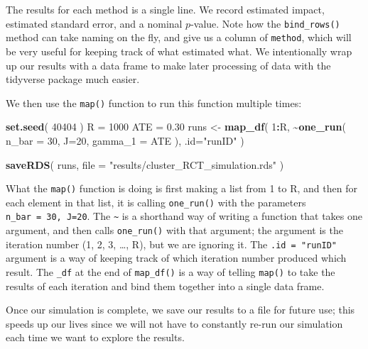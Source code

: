 \documentclass[
]{book}
\newenvironment{Shaded}{\begin{snugshade}}{\end{snugshade}}
\newcommand{\AttributeTok}[1]{\textcolor[rgb]{0.13,0.29,0.53}{#1}}
\newcommand{\DecValTok}[1]{\textcolor[rgb]{0.00,0.00,0.81}{#1}}
\newcommand{\FloatTok}[1]{\textcolor[rgb]{0.00,0.00,0.81}{#1}}
\newcommand{\FunctionTok}[1]{\textcolor[rgb]{0.13,0.29,0.53}{\textbf{#1}}}
\newcommand{\NormalTok}[1]{#1}
\newcommand{\OtherTok}[1]{\textcolor[rgb]{0.56,0.35,0.01}{#1}}
\newcommand{\SpecialCharTok}[1]{\textcolor[rgb]{0.81,0.36,0.00}{\textbf{#1}}}
\newcommand{\StringTok}[1]{\textcolor[rgb]{0.31,0.60,0.02}{#1}}
\begin{document}
The results for each method is a single line.
We record estimated impact, estimated standard error, and a nominal \(p\)-value.
Note how the \texttt{bind\_rows()} method can take naming on the fly, and give us a column of \texttt{method}, which will be very useful for keeping track of what estimated what.
We intentionally wrap up our results with a data frame to make later processing of data with the tidyverse package much easier.

We then use the \texttt{map()} function to run this function multiple times:

\begin{Shaded}
\begin{Highlighting}[]
\FunctionTok{set.seed}\NormalTok{( }\DecValTok{40404}\NormalTok{ )}
\NormalTok{R }\OtherTok{=} \DecValTok{1000}
\NormalTok{ATE }\OtherTok{=} \FloatTok{0.30}
\NormalTok{runs }\OtherTok{\textless{}{-}} 
  \FunctionTok{map\_df}\NormalTok{( }\DecValTok{1}\SpecialCharTok{:}\NormalTok{R, }\SpecialCharTok{\textasciitilde{}}\FunctionTok{one\_run}\NormalTok{( }\AttributeTok{n\_bar =} \DecValTok{30}\NormalTok{, }\AttributeTok{J=}\DecValTok{20}\NormalTok{, }\AttributeTok{gamma\_1 =}\NormalTok{ ATE ),}
          \AttributeTok{.id=}\StringTok{"runID"}\NormalTok{ ) }

\FunctionTok{saveRDS}\NormalTok{( runs, }\AttributeTok{file =} \StringTok{"results/cluster\_RCT\_simulation.rds"}\NormalTok{ )}
\end{Highlighting}
\end{Shaded}

What the \texttt{map()} function is doing is first making a list from 1 to R, and then for each element in that list, it is calling \texttt{one\_run()} with the parameters \texttt{n\_bar\ =\ 30,\ J=20}.
The \texttt{\textasciitilde{}} is a shorthand way of writing a function that takes one argument, and then calls \texttt{one\_run()} with that argument; the argument is the iteration number (1, 2, 3, \ldots, R), but we are ignoring it. The \texttt{.id\ =\ "runID"} argument is a way of keeping track of which iteration number produced which result.
The \texttt{\_df} at the end of \texttt{map\_df()} is a way of telling \texttt{map()} to take the results of each iteration and bind them together into a single data frame.

Once our simulation is complete, we save our results to a file for future use; this speeds up our lives since we will not have to constantly re-run our simulation each time we want to explore the results.
\end{document}
